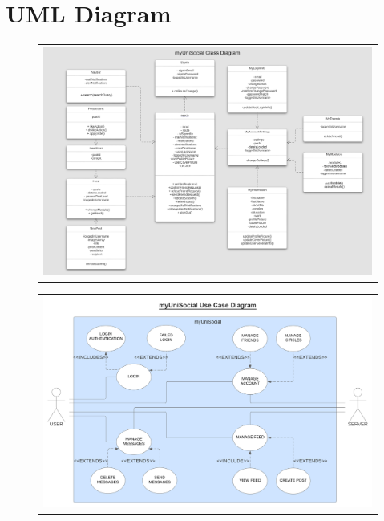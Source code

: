 \documentclass[lettersize,journal]{IEEEtran}
\begin{document}
\newpage
\newpage
\clearpage
\appendices
\newpage
\section{UML Diagram}

\begin{figure}[h!]
	\begin{tabular}{@{}c@{}}
		\includegraphics[width=.8\textwidth]{myUniSocialClassDiagram.png}
  	\end{tabular}



 	\begin{tabular}{@{}c@{}}
 		\includegraphics[width=.8\textwidth]{myUniSocialUseCaseDiagram.png}
 	\end{tabular}
\end{figure}
\clearpage
\end{document}
